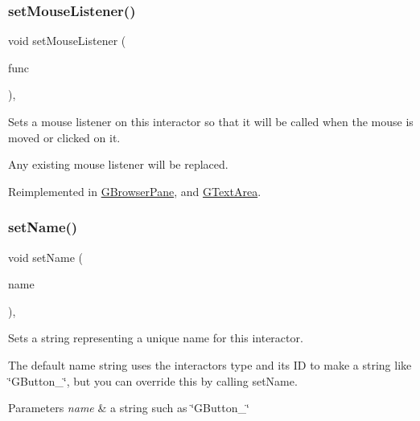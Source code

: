 \mbox{\label{classGInteractor_aea7f647ea62d59f71b5fad6aa65eeaf9}} 
\subsubsection{\texorpdfstring{set\+Mouse\+Listener()}{setMouseListener()}\hspace{0.1cm}{\footnotesize\ttfamily [2/2]}}
{\footnotesize\ttfamily void set\+Mouse\+Listener (\begin{DoxyParamCaption}\item[{G\+Event\+Listener\+Void}]{func }\end{DoxyParamCaption})\hspace{0.3cm}{\ttfamily [virtual]}, {\ttfamily [inherited]}}



Sets a mouse listener on this interactor so that it will be called when the mouse is moved or clicked on it. 

Any existing mouse listener will be replaced. 

Reimplemented in \mbox{\hyperlink{classGBrowserPane_a3ed42c5f929cba378927916dd73e6576}{G\+Browser\+Pane}}, and \mbox{\hyperlink{classGTextArea_a3ed42c5f929cba378927916dd73e6576}{G\+Text\+Area}}.

\mbox{\label{classGInteractor_a9d3a2685df23b5e7cbf59c19c4a1f9b5}} 
\subsubsection{\texorpdfstring{set\+Name()}{setName()}}
{\footnotesize\ttfamily void set\+Name (\begin{DoxyParamCaption}\item[{const std\+::string \&}]{name }\end{DoxyParamCaption})\hspace{0.3cm}{\ttfamily [virtual]}, {\ttfamily [inherited]}}



Sets a string representing a unique name for this interactor. 

The default name string uses the interactor\textquotesingle{}s type and its ID to make a string like \char`\"{}\+G\+Button\+\_\char`\"{}, but you can override this by calling set\+Name. 
\begin{DoxyParams}{Parameters}
{\em name} & a string such as \char`\"{}\+G\+Button\+\_\char`\"{} \\
\hline
\end{DoxyParams}
\mbox{\label{classGInteractor_a1ab987704fce32098706c6f00fb08218}} 

